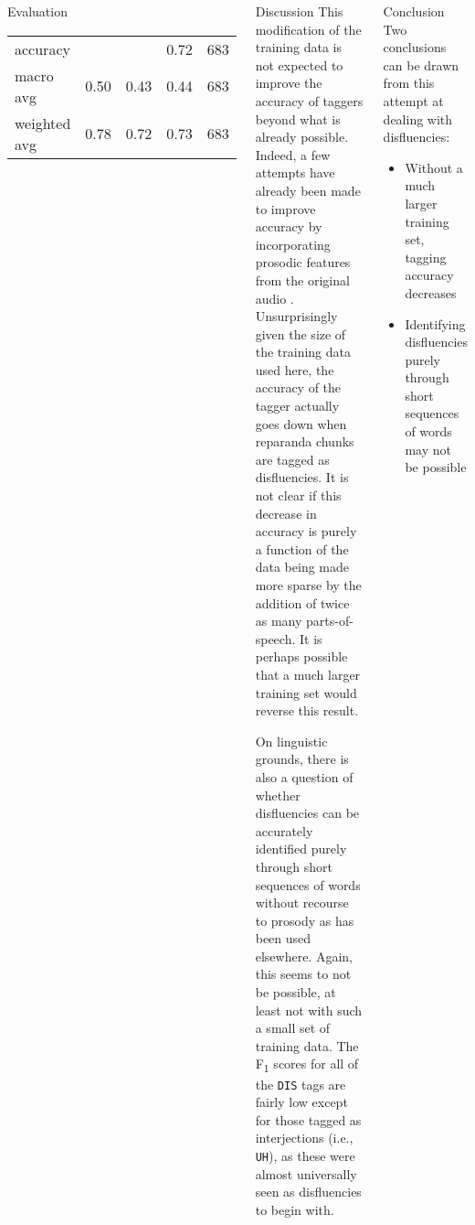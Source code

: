 \documentclass{beamer}\usepackage[]{graphicx}\usepackage[]{color}
\begin{document}
\begin{frame}[t]{}
\begin{columns}
\begin{block}{Evaluation}
{\begin{tabular}{l r r r r}
              \hline
              accuracy     &           &        & 0.72 & 683 \\
              macro avg    & 0.50      & 0.43   & 0.44 & 683 \\
              weighted avg & 0.78      & 0.72   & 0.73 & 683 \\
            \end{tabular}
          }
        \end{block}
        \begin{block}{Discussion}
          This modification of the training data is not expected to improve the accuracy of taggers beyond what is already possible.
          Indeed, a few attempts have already been made to improve accuracy by incorporating prosodic features from the original audio \parencite[e.g.,][]{christodoulides_dismo:_2018}.
          Unsurprisingly given the size of the training data used here, the accuracy of the tagger actually goes down when reparanda chunks are tagged as disfluencies.
          It is not clear if this decrease in accuracy is purely a function of the data being made more sparse by the addition of twice as many parts-of-speech.
          It is perhaps possible that a much larger training set would reverse this result.

          On linguistic grounds, there is also a question of whether disfluencies can be accurately identified purely through short sequences of words without recourse to prosody as has been used elsewhere.
          Again, this seems to not be possible, at least not with such a small set of training data.
          The F\textsubscript{1} scores for all of the \texttt{DIS} tags are fairly low except for those tagged as interjections (i.e., \texttt{UH}), as these were almost universally seen as disfluencies to begin with.
        \end{block}
        \begin{block}{Conclusion}
          Two conclusions can be drawn from this attempt at dealing with disfluencies:
          \begin{itemize}
            \item Without a much larger training set, tagging accuracy decreases
            \item Identifying disfluencies purely through short sequences of words may not be possible
          \end{itemize}
        \end{block}
    \end{columns}
  \end{frame}
\end{document}
